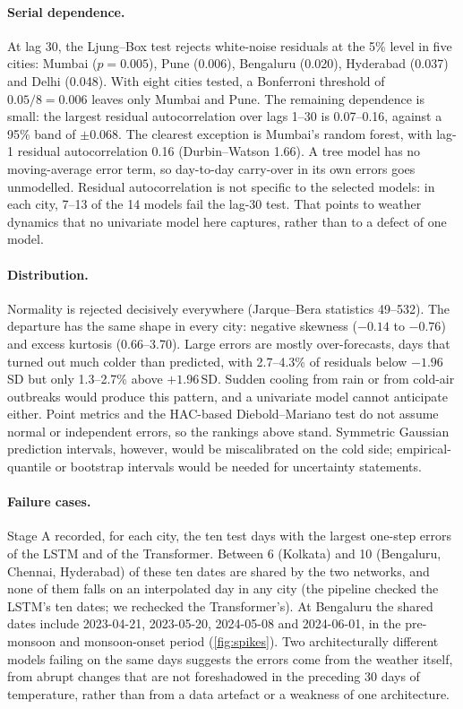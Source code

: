 \documentclass[11pt,a4paper]{article}
\begin{document}
\paragraph{Serial dependence.} At lag 30, the Ljung--Box test rejects white-noise residuals at the 5\% level in five cities: Mumbai ($p = 0.005$), Pune (0.006), Bengaluru (0.020), Hyderabad (0.037) and Delhi (0.048). With eight cities tested, a Bonferroni threshold of $0.05/8 = 0.006$ leaves only Mumbai and Pune. The remaining dependence is small: the largest residual autocorrelation over lags 1--30 is 0.07--0.16, against a 95\% band of $\pm 0.068$. The clearest exception is Mumbai's random forest, with lag-1 residual autocorrelation 0.16 (Durbin--Watson 1.66). A tree model has no moving-average error term, so day-to-day carry-over in its own errors goes unmodelled. Residual autocorrelation is not specific to the selected models: in each city, 7--13 of the 14 models fail the lag-30 test. That points to weather dynamics that no univariate model here captures, rather than to a defect of one model.

\paragraph{Distribution.} Normality is rejected decisively everywhere (Jarque--Bera statistics 49--532). The departure has the same shape in every city: negative skewness ($-0.14$ to $-0.76$) and excess kurtosis (0.66--3.70). Large errors are mostly over-forecasts, days that turned out much colder than predicted, with 2.7--4.3\% of residuals below $-1.96$\,SD but only 1.3--2.7\% above $+1.96$\,SD. Sudden cooling from rain or from cold-air outbreaks would produce this pattern, and a univariate model cannot anticipate either. Point metrics and the HAC-based Diebold--Mariano test do not assume normal or independent errors, so the rankings above stand. Symmetric Gaussian prediction intervals, however, would be miscalibrated on the cold side; empirical-quantile or bootstrap intervals would be needed for uncertainty statements.

\paragraph{Failure cases.} Stage A recorded, for each city, the ten test days with the largest one-step errors of the LSTM and of the Transformer. Between 6 (Kolkata) and 10 (Bengaluru, Chennai, Hyderabad) of these ten dates are shared by the two networks, and none of them falls on an interpolated day in any city (the pipeline checked the LSTM's ten dates; we rechecked the Transformer's). At Bengaluru the shared dates include 2023-04-21, 2023-05-20, 2024-05-08 and 2024-06-01, in the pre-monsoon and monsoon-onset period (\cref{fig:spikes}). Two architecturally different models failing on the same days suggests the errors come from the weather itself, from abrupt changes that are not foreshadowed in the preceding 30 days of temperature, rather than from a data artefact or a weakness of one architecture.
\end{document}
